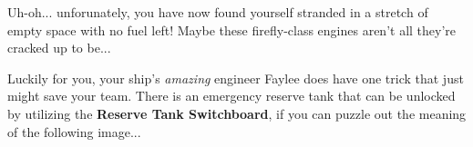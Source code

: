 Uh-oh... unforunately, you have now found yourself stranded
in a stretch of empty space with no fuel left! Maybe these firefly-class
engines aren't all they're cracked up to be...

Luckily for you,
your ship's \textit{amazing} engineer Faylee does have one trick that
just might save your team. There is
an emergency reserve tank that can be unlocked by utilizing the
\textbf{Reserve Tank Switchboard}, if you can puzzle out the meaning
of the following image...

\begin{center}
\end{center} 
